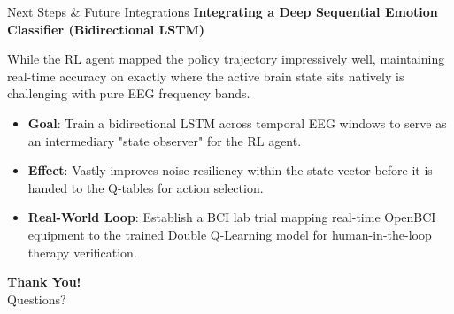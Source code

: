\documentclass[10pt, aspectratio=169]{beamer}
\begin{document}
\begin{frame}{Next Steps \& Future Integrations}
    \textbf{Integrating a Deep Sequential Emotion Classifier (Bidirectional LSTM)}
    
    While the RL agent mapped the policy trajectory impressively well, maintaining real-time accuracy on exactly where the active brain state sits natively is challenging with pure EEG frequency bands.
    
    \begin{itemize}
        \item \textbf{Goal}: Train a bidirectional LSTM across temporal EEG windows to serve as an intermediary "state observer" for the RL agent. 
        \item \textbf{Effect}: Vastly improves noise resiliency within the state vector before it is handed to the Q-tables for action selection.
        \item \textbf{Real-World Loop}: Establish a BCI lab trial mapping real-time OpenBCI equipment to the trained Double Q-Learning model for human-in-the-loop therapy verification.
    \end{itemize}
\end{frame}

\begin{frame}
    \centering
    \Huge \textbf{Thank You!} \\
    \vspace{1cm}
    \large Questions?
\end{frame}
\end{document}
